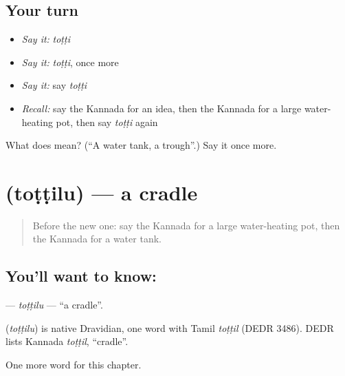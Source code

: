 \subsection*{Your turn}
\begin{itemize}
\raggedright
  \item \emph{Say it:} \emph{toṭṭi}
  \item \emph{Say it:} \emph{toṭṭi}, once more
  \item \emph{Say it:} say \emph{toṭṭi}
  \item \emph{Recall:} say the Kannada for an idea, then the Kannada for a large water-heating pot, then say \emph{toṭṭi} again
\end{itemize}

\begin{tcolorbox}[breakable,colback=teal!4,colframe=teal!35!black,title={Before you move on}]
What does  mean? (\textquotedblleft{}A water tank, a trough\textquotedblright{}.) Say it once more.
\end{tcolorbox}
\section[\texorpdfstring{\kn{ತೊಟ್ಟಿಲು} (toṭṭilu)}{ತೊಟ್ಟಿಲು (toṭṭilu)}]{ (toṭṭilu) — a cradle}

\label{lesson:KA-C229-tottilu}



\begin{quote}
Before the new one: say the Kannada for a large water-heating pot, then the Kannada for a water tank.
\end{quote}

\subsection*{You'll want to know: }
\textbf{} — \emph{toṭṭilu} — \textquotedblleft{}a cradle\textquotedblright{}.

\begin{cousinweb}
\textbf{} (\emph{toṭṭilu}) is native Dravidian, one word with Tamil \emph{toṭṭil} (DEDR 3486). DEDR lists Kannada \emph{toṭṭil}, \textquotedblleft{}cradle\textquotedblright{}.
\end{cousinweb}

\begin{grammarlens}[title={What you've built}]
One more word for this chapter.
\end{grammarlens}

